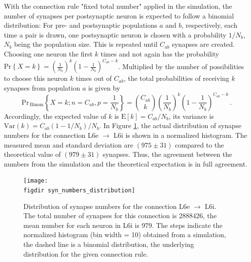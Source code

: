 With the connection rule "fixed total number" applied in the simulation, 
the number of synapses per postsynaptic neuron is expected to follow a binomial distribution:
For pre- and postsynaptic populations $a$ and $b$, respectively, 
each time a pair is drawn, one postsynaptic neuron is chosen with a probability 
$1 / N_b$, $N_b$ being the population size. This is repeated until $C_{ab}$ synapses are
created. 
Choosing one neuron the first $k$ times and not again has the probability 
$\text{Pr}\left\{X = k\right\} = 
\left( \frac{1}{N_b} \right)^{k} 
\left( 1 - \frac{1}{N_b} \right)^{C_{ab} - k}$.
Multiplied by the number of possibilities to choose this neuron $k$ times out of 
$C_{ab}$, the total probabilities of receiving $k$ synapses from population $a$ is
given by
\begin{equation}
    \text{Pr}_{\,\text{Binom}}\left\{X = k; n=C_{ab}, p=\frac{1}{N_b}\right\} = 
        {C_{ab}\choose{k}} 
        \left( \frac{1}{N_b} \right)^{k} 
        \left( 1 - \frac{1}{N_b} \right)^{C_{ab} - k} \,.
    \label{eq:binomial}
\end{equation}
Accordingly, the expected value of $k$ is $\text{E}[k] = C_{ab} / N_b$, its variance is 
$\text{Var}(k) = C_{ab} (1 - 1/N_b) / N_b$. 
In Figure \ref{fig:syn_numbers_distribution}, the actual distribution of synapse numbers 
for the connection L6e $\to$ L6i is shown in a normalized histogram. 
The measured mean and standard deviation are $(975 \pm 31)$ compared to the theoretical 
value of $(979 \pm 31)$ synapses. 
Thus, the agreement between the numbers from the simulation and the theoretical expectation is
in full agreement. 
\begin{figure}[tb]
    \centering
    \texttt{[image: \\figdir syn\_numbers\_distribution]}
    \caption{
        Distribution of synapse numbers for the connection L6e $\to$ L6i.
        The total number of synapses for this connection is $2888426$, 
        the mean number for each neuron in L6i is $979$.
        The steps indicate the normalized histogram (bin width = 10) obtained 
        from a simulation, the dashed line is a binomial distribution, the 
        underlying distribution for the given connection rule. 
    }
    \label{fig:syn_numbers_distribution}
\end{figure}

